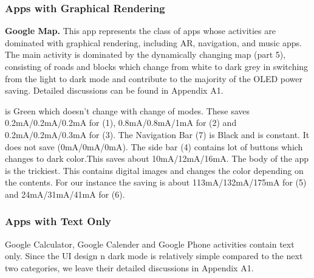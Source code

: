 \subsubsection{Apps with Graphical Rendering}

{\bf Google Map.} This app represents the class of apps
whose activities are dominated with graphical rendering, including
AR, navigation, and music apps.
The
main activity is dominated
by the dynamically changing map (part 5),
consisting of roads and blocks which
change from white to dark grey in switching from the light to dark mode
and contribute to the majority of the OLED power saving.
Detailed discussions can be found in Appendix A1.
\fi


is Green which doesn't change
with change of modes. These saves 0.2mA/0.2mA/0.2mA for (1),
0.8mA/0.8mA/1mA for (2) and 0.2mA/0.2mA/0.3mA for (3). The Navigation Bar (7)
is Black and is constant. It does not save (0mA/0mA/0mA). The side bar (4)
contains lot of buttons which changes to dark color.This saves
about 10mA/12mA/16mA. The body of the app is the trickiest. This contains
digital images and changes the color depending on the contents. For our
instance the saving is about 113mA/132mA/175mA for (5) and
24mA/31mA/41mA for (6).
\fi

\subsubsection{Apps with Text Only}

Google Calculator, Google Calender and Google Phone activities contain
text only. Since the UI design n dark mode is relatively simple compared
to the next two categories,
we leave their detailed discussions in Appendix A1.

\fi




